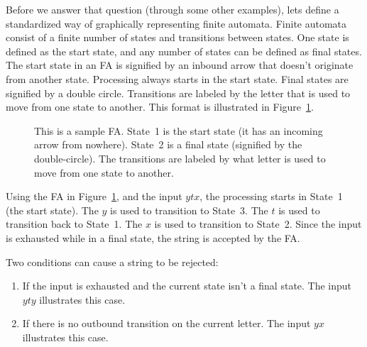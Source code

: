 \documentclass[letterpaper,12pt,openany,reqno]{book}%
\newcommand{\faterminalnode}[3] {\node at (#1) (#2) [circle, draw, double, minimum size=24pt] {#2};}
\newcommand{\fastart}[1] {\coordinate (start) at (#1);}
\newcommand{\fanonterminalnode}[2] {\node at (#1) (#2) [circle, draw, minimum size=24pt] {#2};}
\newcommand{\fatransition}[3] {\draw [->] (#1) -- (#2) node [midway, above] {#3};}
\newcommand{\faarctransition}[5] {\draw [->] (#1) to[out=#4, in=#5] node  [midway, above] {#3} (#2) ;}
\begin{document}
Before we answer that question (through some other examples), lets define a standardized way of graphically representing finite automata. Finite automata consist of a finite number of states and transitions between states. One state is defined as the start state, and any number of states can be defined as final states. The start state in an FA is signified by an inbound arrow that doesn't originate from another state. Processing always starts in the start state. Final states are signified by a double circle. Transitions are labeled by the letter that is used to move from one state to another. This format is illustrated in Figure~\ref{F.FA_1}.

\begin{figure}[hbt]
\centering
{}
 \caption[Sample Finite Automaton]{This is a sample FA. State~1 is the start state (it has an incoming arrow from nowhere). State~2 is a final state (signified by the double-circle). The transitions are labeled by what letter is used to move from one state to another.}
  \label{F.FA_1}
\end{figure}

Using the FA in Figure~\ref{F.FA_1}, and the input $ytx$, the processing starts in State~1 (the start state). The $y$ is used to transition to State~3. The $t$ is used to transition back to State~1. The $x$ is used to transition to State~2. Since the input is exhausted while in a final state, the string is accepted by the FA.

Two conditions can cause a string to be rejected: 
\begin{enumerate}
\item If the input is exhausted and the current state isn't a final state. The input $yty$ illustrates this case.
\item If there is no outbound transition on the current letter. The input $yx$ illustrates this case.
\end{enumerate}
\end{document}
